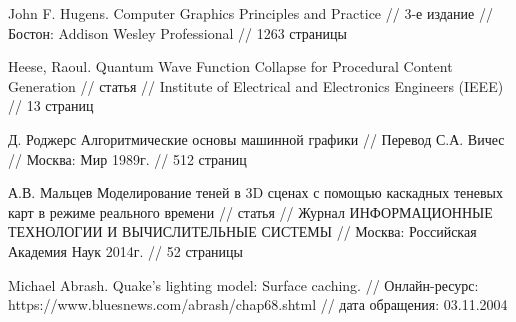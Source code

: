 \begin{thebibliography}{}
   John F. Hugens. Computer Graphics Principles and Practice // 3-е издание // Бостон: Addison Wesley Professional // 1263 страницы

   Heese, Raoul. Quantum Wave Function Collapse for Procedural Content Generation // статья // Institute of Electrical and Electronics Engineers (IEEE) // 13 страниц

   Д. Роджерс Алгоритмические основы машинной графики // Перевод С.А. Вичес // Москва: Мир 1989г. // 512 страниц 

   А.В. Мальцев Моделирование теней в 3D сценах с помощью каскадных теневых карт в режиме реального времени // статья // Журнал ИНФОРМАЦИОННЫЕ ТЕХНОЛОГИИ И ВЫЧИСЛИТЕЛЬНЫЕ СИСТЕМЫ // Москва: Российская Академия Наук 2014г. // 52 страницы

   Michael Abrash. Quake's lighting model: Surface caching. // Онлайн-ресурс: https://www.bluesnews.com/abrash/chap68.shtml // дата обращения: 03.11.2004



\end{thebibliography}